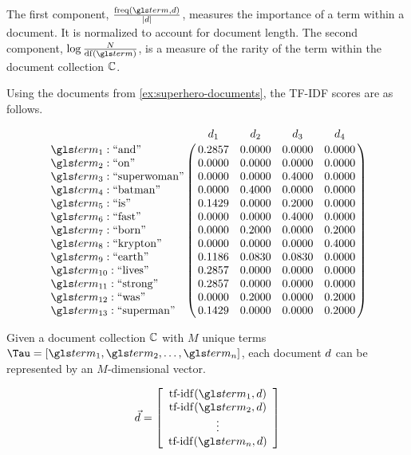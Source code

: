 		\begin{remark}
			The first component, \(\frac{\freq\left(\term, \doc\right)}{\abs{\doc}}\), measures the importance of a term within a document.  It is normalized to account for document length.	 The second component, \(\log{\frac{N}{\df\left(\term\right)}}\), is a measure of the rarity of the term within the document collection \(\mathbb{C}\).
		\end{remark}
		
		\begin{ex}
			Using the documents from \vref{ex:superhero-documents}, the TF-IDF scores are as follows.
			
			\[
				\bordermatrix{
					~ & \doc_1 & \doc_2 & \doc_3 & \doc_4 \cr
					\term_1 : \text{``and''} & 0.2857 & 0.0000 & 0.0000 & 0.0000 \cr
					\term_2 : \text{``on''} & 0.0000 & 0.0000 & 0.0000 & 0.0000 \cr
					\term_3 : \text{``superwoman''} & 0.0000 & 0.0000 & 0.4000 & 0.0000 \cr
					\term_4 : \text{``batman''} & 0.0000 & 0.4000 & 0.0000 & 0.0000 \cr
					\term_5 : \text{``is''} & 0.1429 & 0.0000 & 0.2000 & 0.0000 \cr
					\term_6 : \text{``fast''} & 0.0000 & 0.0000 & 0.4000 & 0.0000 \cr
					\term_7 : \text{``born''} & 0.0000 & 0.2000 & 0.0000 & 0.2000 \cr
					\term_8 : \text{``krypton''} & 0.0000 & 0.0000 & 0.0000 & 0.4000 \cr
					\term_9 : \text{``earth''} & 0.1186 & 0.0830 & 0.0830 & 0.0000 \cr
					\term_{10} : \text{``lives''} & 0.2857 & 0.0000 & 0.0000 & 0.0000 \cr
					\term_{11} : \text{``strong''} & 0.2857 & 0.0000 & 0.0000 & 0.0000 \cr
					\term_{12} : \text{``was''} & 0.0000 & 0.2000 & 0.0000 & 0.2000 \cr
					\term_{13} : \text{``superman''} & 0.1429 & 0.0000 & 0.0000 & 0.2000 \cr
				}
			\]
		\end{ex}

		\begin{defn}
			Given a document collection \(\mathbb{C}\) with \(M\) unique terms \(\terms = [\term_1, \term_2, \dotsc, \term_n ]\), each document \(d\) can be represented by an \(M\)-dimensional vector.
			
			\[
				\vec{\doc} = 
				\left[
				\begin{array}{c}
					\tfidf(\term_1, \doc) \\
					\tfidf(\term_2, \doc) \\
					\vdots \\
					\tfidf(\term_n, \doc)
				\end{array}
				\right]
			\]
		\end{defn}
		
